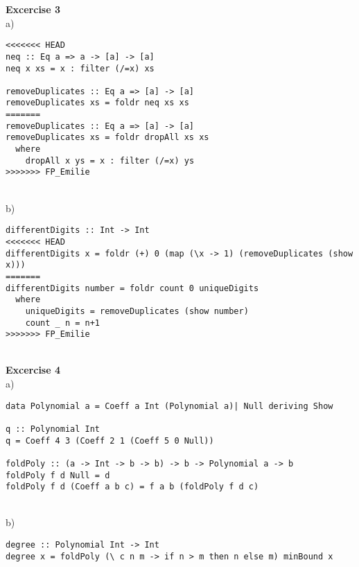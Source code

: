 \documentclass[a4paper,12pt,oneside]{book}
\begin{document}
\textbf{Excercise 3} \\%
a) 
\begin{lstlisting}
<<<<<<< HEAD
neq :: Eq a => a -> [a] -> [a]
neq x xs = x : filter (/=x) xs

removeDuplicates :: Eq a => [a] -> [a]
removeDuplicates xs = foldr neq xs xs
=======
removeDuplicates :: Eq a => [a] -> [a]
removeDuplicates xs = foldr dropAll xs xs
  where
    dropAll x ys = x : filter (/=x) ys
>>>>>>> FP_Emilie
\end{lstlisting}
~\\     
b)
\begin{lstlisting}
differentDigits :: Int -> Int
<<<<<<< HEAD
differentDigits x = foldr (+) 0 (map (\x -> 1) (removeDuplicates (show x))) 
=======
differentDigits number = foldr count 0 uniqueDigits
  where
    uniqueDigits = removeDuplicates (show number)
    count _ n = n+1
>>>>>>> FP_Emilie
\end{lstlisting}
~\\     

\textbf{Excercise 4} \\%
a)
\begin{lstlisting}
data Polynomial a = Coeff a Int (Polynomial a)| Null deriving Show

q :: Polynomial Int
q = Coeff 4 3 (Coeff 2 1 (Coeff 5 0 Null))

foldPoly :: (a -> Int -> b -> b) -> b -> Polynomial a -> b
foldPoly f d Null = d
foldPoly f d (Coeff a b c) = f a b (foldPoly f d c)
\end{lstlisting}
~\\    
b)
\begin{lstlisting}
degree :: Polynomial Int -> Int
degree x = foldPoly (\ c n m -> if n > m then n else m) minBound x 
\end{lstlisting}
~\\    
\end{document}
